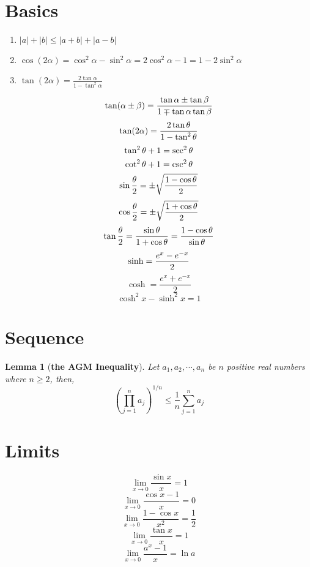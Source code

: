 \documentclass[12pt]{article}
\newcommand{\abs}[1]{\left| #1 \right|}
\theoremstyle{plain}
\newtheorem{lemma}{Lemma}[section]
\newcommand{\dlim}{\displaystyle\lim\limits}
\begin{document}
	
	\section{Basics}
	\begin{enumerate}
			\item $\abs{a}+\abs{b}\leq \abs{a+b}+\abs{a-b}$
			\item $\cos(2\alpha) = \cos^2 \alpha - \sin^2\alpha
				= 2\cos^2\alpha-1=1-2\sin^2\alpha$
			\item $\tan (2\alpha) =\frac{2\tan \alpha}{1-\tan^2\alpha}$
	\end{enumerate}
 	\[
		\tan(\alpha\pm\beta)=\frac{\tan\alpha\pm\tan\beta}{1\mp\tan\alpha\tan\beta}\\
	\]
		\[
		\tan(2\alpha)=\frac{2\tan\theta}{1-\tan^2\theta}\\
	\]
	\[
		\tan^2 \theta +1 = \sec^2\theta\\
	\]
	\[
		\cot^2 \theta +1 = \csc^2\theta\\
	\]
	\[
		\sin\frac{\theta}2=\pm\sqrt{\frac{1-\cos\theta}2}\\
	\]
	\[
		\cos\frac{\theta}2=\pm\sqrt{\frac{1+\cos\theta}2}\\
	\]
	\[
		\tan\frac{\theta}2 =\frac{\sin \theta}{1+\cos\theta}
		=\frac{1-\cos\theta}{\sin\theta}\\
	\]
	\[
		\sinh = \frac{e^x-e^{-x}}2\\
	\]
	\[
		\cosh =\frac{e^x+e^{-x}}{2}
	\]
	\[
		\cosh ^2x - \sinh^2x = 1
	\]
	
	\section{Sequence}
	\begin{lemma}[\textbf{the AGM Inequality}]
		Let $a_1, a_2,\cdots,a_n$ be $n$ positive real numbers where $n\geq 2$, 
		then, 
		\[
			(\prod_{j=1}^n a_j)^{1/n}\leq\frac1n\sum_{j=1}^n a_j
		\]
	\end{lemma}


	\section{Limits}
		\[
			\dlim_{x\to 0}\frac{\sin x}x = 1
		\]
		\[
			\dlim_{x\to 0}\frac{\cos x -1}x=0
		\]
		\[
			\dlim_{x\to 0}\frac{1-\cos x}{x^2}=\frac12
		\]
		\[
			\dlim_{x\to 0}\frac{\tan x}x = 1
		\]
		\[
			\dlim_{x\to 0}\frac{a^x-1}x=\ln a
		\]
\end{document}
